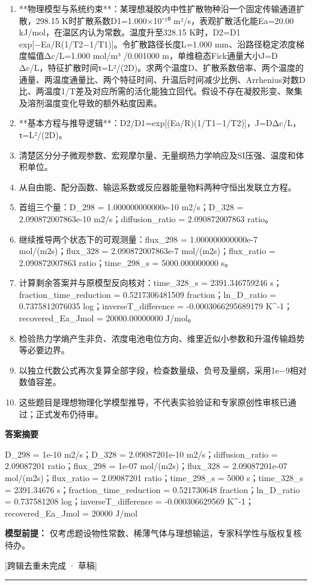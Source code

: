 \documentclass[UTF8,11pt,a4paper]{ctexart}
\begin{document}
\begin{enumerate}
\item **物理模型与系统约束**：某理想凝胶内中性扩散物种沿一个固定传输通道扩散，298.15 K时扩散系数D1=1.000×10⁻¹⁰ m²/s，表观扩散活化能Ea=20.00 kJ/mol，在温区内认为常数。温度升至328.15 K时，D2=D1 exp[−Ea/R(1/T2−1/T1)]。令扩散路径长度L=1.000 mm、沿路径稳定浓度梯度幅值Δc/L=1.000 mol/m³ /0.001000 m，单维稳态Fick通量大小J=D Δc/L，特征扩散时间τ=L²/(2D)。求两个温度D、扩散系数倍率、两个温度的通量、两温度通量比、两个特征时间、升温后时间减少比例、Arrhenius对数D比、两温度1/T差及对应所需的活化能独立回代。假设不存在凝胶形变、聚集及溶剂温度变化导致的额外粘度因素。
\item **基本方程与推导逻辑**：D2/D1=exp[(Ea/R)(1/T1−1/T2)]，J=DΔc/L，τ=L²/(2D)。
\item 清楚区分分子微观参数、宏观摩尔量、无量纲热力学响应及SI压强、温度和体积单位。
\item 从自由能、配分函数、输运系数或反应器能量物料两种守恒出发联立方程。
\item 首组三个量：D\_298 = 1.000000000000e-10 m2/s；D\_328 = 2.090872007863e-10 m2/s；diffusion\_ratio = 2.090872007863 ratio。
\item 继续推导两个状态下的可观测量：flux\_298 = 1.000000000000e-7 mol/(m2s)；flux\_328 = 2.090872007863e-7 mol/(m2s)；flux\_ratio = 2.090872007863 ratio；time\_298\_s = 5000.000000000 s。
\item 计算剩余答案并与原模型反向核对：time\_328\_s = 2391.346759246 s；fraction\_time\_reduction = 0.5217306481509 fraction；ln\_D\_ratio = 0.7375812076035 log；inverseT\_difference = -0.0003066295689179 K\textasciicircum{}-1；recovered\_Ea\_Jmol = 20000.00000000 J/mol。
\item 检验热力学熵产生非负、浓度电池电位方向、维里近似小参数和升温传输趋势等必要边界。
\item 以独立代数公式再次复算全部字段，检查数量级、负号及量纲，采用1e−9相对数值容差。
\item 这些题目是理想物理化学模型推导，不代表实验验证和专家原创性审核已通过；正式发布仍待审。
\end{enumerate}
\noindent\textbf{答案摘要}\par
D\_298 = 1e-10 m2/s；D\_328 = 2.09087201e-10 m2/s；diffusion\_ratio = 2.09087201 ratio；flux\_298 = 1e-07 mol/(m2s)；flux\_328 = 2.09087201e-07 mol/(m2s)；flux\_ratio = 2.09087201 ratio；time\_298\_s = 5000 s；time\_328\_s = 2391.34676 s；fraction\_time\_reduction = 0.521730648 fraction；ln\_D\_ratio = 0.737581208 log；inverseT\_difference = -0.000306629569 K\textasciicircum{}-1；recovered\_Ea\_Jmol = 20000 J/mol\par
\noindent\textbf{模型前提：}
仅考虑题设物性常数、稀薄气体与理想输运，专家科学性与版权复核待办。\par
\noindent\textcolor{red!65!black}{[跨辑去重未完成 · 草稿]} \par
\medskip\hrule\medskip
\end{document}
